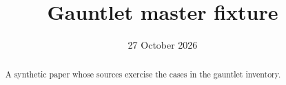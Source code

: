 \documentclass[11pt]{article}%
\title{Gauntlet master fixture}
\author{\gmauthorlist}
\date{27 October 2026}
\begin{document}
\maketitle
\begin{abstract}
A synthetic paper whose sources exercise the cases in the gauntlet inventory.
\end{abstract}










\appendix%
%
\ifdefined\gmarxiv\fi%
\makeatletter%


\end{document}
